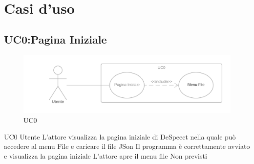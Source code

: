 \documentclass[../AnalisideiRequisiti.tex]{subfiles}
\begin{document}

	\chapter{Casi d'uso}
	\section{UC0:Pagina Iniziale}
	\begin{figure}[htp]
		\caption{UC0}
		\centering
		\includegraphics[width=\textwidth]{../img/UC00.png}
	\end{figure}
	\UserCase
	{UC0}
	{Utente}
	{}
	{L'attore visualizza la pagina iniziale di DeSpeect nella quale può accedere al menu File e caricare il file JSon}
	{Il programma è correttamente avviato e visualizza la pagina iniziale}
	{L'attore apre il menu file}
	{Non previsti}
	{}
	
\end{document}
